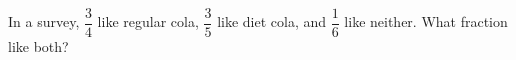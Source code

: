 In a survey, $\dfrac{3}{4}$ like regular cola, $\dfrac{3}{5}$ like diet cola, and $\dfrac{1}{6}$ like neither. What fraction like both?
